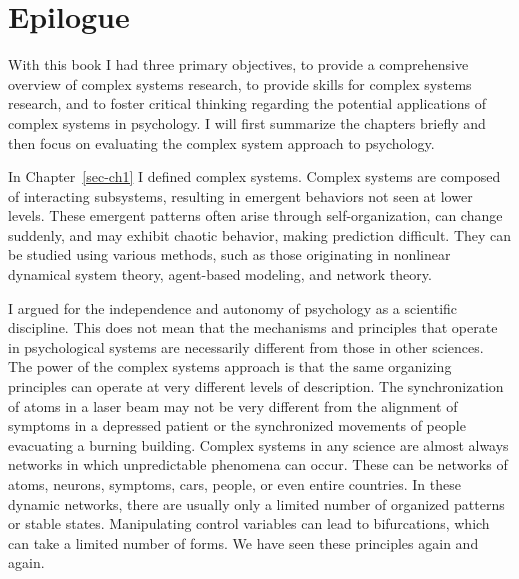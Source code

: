 \documentclass[
  a4paper,
  DIV=11,
  numbers=noendperiod,
  oneside]{scrreprt}
\begin{document}

\hypertarget{sec-ch8}{%
\chapter{Epilogue}\label{sec-ch8}}

With this book I had three primary objectives, to provide a
comprehensive overview of complex systems research, to provide skills
for complex systems research, and to foster critical thinking regarding
the potential applications of complex systems in psychology. I will
first summarize the chapters briefly and then focus on evaluating the
complex system approach to psychology.

In Chapter~\ref{sec-ch1} I defined complex systems. Complex systems are
composed of interacting subsystems, resulting in emergent behaviors not
seen at lower levels. These emergent patterns often arise through
self-organization, can change suddenly, and may exhibit chaotic
behavior, making prediction difficult. They can be studied using various
methods, such as those originating in nonlinear dynamical system theory,
agent-based modeling, and network theory.

I argued for the independence and autonomy of psychology as a scientific
discipline. This does not mean that the mechanisms and principles that
operate in psychological systems are necessarily different from those in
other sciences. The power of the complex systems approach is that the
same organizing principles can operate at very different levels of
description. The synchronization of atoms in a laser beam may not be
very different from the alignment of symptoms in a depressed patient or
the synchronized movements of people evacuating a burning building.
Complex systems in any science are almost always networks in which
unpredictable phenomena can occur. These can be networks of atoms,
neurons, symptoms, cars, people, or even entire countries. In these
dynamic networks, there are usually only a limited number of organized
patterns or stable states. Manipulating control variables can lead to
bifurcations, which can take a limited number of forms. We have seen
these principles again and again.
\end{document}

